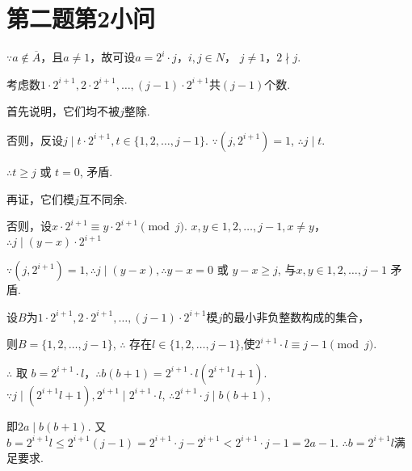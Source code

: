 \section{第二题第2小问}
$\because a \not \in \overline{A} $，且$a \neq 1$，故可设$a = 2^i \cdot j$，$i, j \in N$，
$j \neq 1$，$2 \nmid j$. \par
考虑数$1 \cdot 2^{i+1}, 2 \cdot 2^{i+1}, \ldots, (j-1) \cdot 2^{i+1}$共$(j-1)$个数. \par
首先说明，它们均不被$j$整除. \par
否则，反设$j \mid t \cdot 2^{i+1}, t \in \{ 1, 2, \ldots, j-1 \}$. 
$ \because (j, 2^{i+1}) = 1$, $ \therefore j \mid t$. \par
$ \therefore t \ge j $ 或 $ t = 0 $, 矛盾. \par
再证，它们模$j$互不同余. \par
否则，设$x \cdot 2^{i+1} \equiv y \cdot 2^{i+1} \pmod j$. $x, y \in {1, 2, \ldots, j-1}, x \neq y$，
$\therefore j \mid (y-x) \cdot 2^{i+1}$ \par
$\because (j, 2^{i+1}) = 1, \therefore j \mid (y-x), \therefore y-x=0$ 或 $y-x \ge j$, 
与$x, y \in {1, 2, \ldots, j-1}$ 矛盾. \par
设$B$为$1 \cdot 2^{i+1}, 2 \cdot 2^{i+1}, \ldots, (j-1) \cdot 2^{i+1}$模$j$的最小非负整数构成的集合，\par
则$B = \{1, 2, \ldots, j-1\}$, $\therefore$ 存在$l \in \{1, 2, \ldots, j-1\}$,使$2^{i+1} \cdot l \equiv j-1 \pmod j$. \par
$\therefore$ 取 $b = 2^{i+1} \cdot l$，$\therefore b(b+1) = 2^{i+1} \cdot l(2^{i+1} l + 1)$. 
$\because j \mid (2^{i+1}l + 1), 2^{i+1} \mid 2^{i+1} \cdot l$, $\therefore 2^{i+1} \cdot j \mid b(b+1)$,\par
即$2a \mid b(b+1)$. 又$b=2^{i+1}l \le 2^{i+1}(j-1) = 2^{i+1} \cdot j - 2^{i+1} < 2^{i+1} \cdot j - 1 = 2a - 1$.
$\therefore b = 2^{i+1}l$满足要求.
